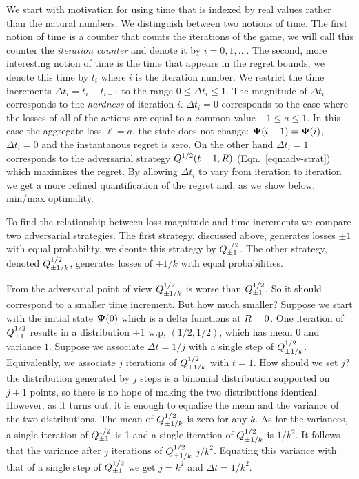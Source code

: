 \documentclass{article}[12pt]
\begin{document}
We start with motivation for using time that is indexed by real
values rather than the natural numbers. We distinguish between two
notions of time. The first notion of time is a counter that
counts the iterations of the game, we will call this counter the {\em
  iteration counter } and denote it by $i=0,1,\ldots$. The second,
more interesting notion of time is the time that appears in the regret
bounds, we denote this time by $t_i$ where $i$ is the iteration
number. We restrict the time increments $\Delta t_i =t_i-t_{i-1}$ to
the range $0\leq \Delta t_i \leq 1$.  The magnitude of $\Delta t_i$
corresponds to the {\em hardness} of iteration $i$. $\Delta t_i=0$
corresponds to the case where the losses of all of the actions are
equal to a common value $-1 \leq a \leq 1$. In this case the aggregate
loss $\ell=a$, the state does not change:
${\bf \Psi}(i-1)={\bf \Psi}(i)$, $\Delta t_i=0$ and the instantanous regret is zero. On the
other hand $\Delta t_i=1$ corresponds to the adversarial strategy
$Q^{1/2}(t-1,R)$ (Eqn.~\ref{eqn:adv-strat}) which maximizes the
regret. By allowing $\Delta t_i$ to vary from iteration to iteration
we get a more refined quantification of the regret and, as we show
below, min/max optimality.

To find the relationship between loss magnitude and time increments 
we compare two adversarial strategies.  The first strategy, discussed above,
generates losses $\pm 1$ with equal probability, we deonte this
strategy by $Q^{1/2}_{\pm 1}$. The other strategy, denoted
$Q^{1/2}_{\pm 1/k}$, generates losses of $\pm 1/k$ with equal
probabilities.

From the adversarial point of view $Q^{1/2}_{\pm 1/k}$ is worse
than $Q^{1/2}_{\pm 1}$. So it should correspond to a smaller
time increment. But how much smaller? Suppose we start with the
initial state ${\bf \Psi}(0)$ which is a delta functions at $R=0$.  One
iteration of $Q^{1/2}_{\pm 1}$ results in a distribution
$\pm 1$ w.p, $(1/2,1/2)$, which has mean $0$ and variance $1$.
Suppose we associate $\Delta t =1/j$ with a single step of
$Q^{1/2}_{\pm 1/k}$.  Equivalently, we associate $j$ iterations
of $Q^{1/2}_{\pm 1/k}$ with $t=1$.  How should we set $j$? the
distribution generated by $j$ steps is a binomial distribution
supported on $j+1$ points, so there is no hope of making the two
distributions identical. However, as it turns out, it is enough to
equalize the mean and the variance of the two distributions. The mean
of $Q^{1/2}_{\pm 1/k}$ is zero for any $k$. As for the
variances, a single iteration of $Q^{1/2}_{\pm 1}$ is 1 and a
single iteration of $Q^{1/2}_{\pm 1/k}$ is $1/k^2$. It follows
that the variance after $j$ iterations of $Q^{1/2}_{\pm 1/k}$
$j/k^2$. Equating this variance with that of a single step of
$Q^{1/2}_{\pm 1}$ we get $j=k^2$ and $\Delta t= 1/k^2$.
\end{document}
